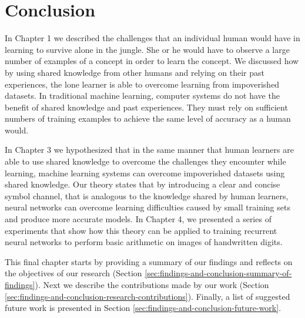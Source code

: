 \chapter{Conclusion} \label{sec:findings-and-conclusion}

In Chapter 1 we described the challenges that an individual human would have in learning to survive alone in the jungle. She or he would have to observe a large number of examples of a concept in order to learn the concept. We discussed how by using shared knowledge from other humans and relying on their past experiences, the lone learner is able to overcome learning from impoverished datasets. In traditional machine learning, computer systems do not have the benefit of shared knowledge and past experiences. They must rely on sufficient numbers of training examples to achieve the same level of accuracy as a human would.

In Chapter 3 we hypothesized that in the same manner that human learners are able to use shared knowledge to overcome the challenges they encounter while learning, machine learning systems can overcome impoverished datasets using shared knowledge. Our theory states that by introducing a clear and concise symbol channel, that is analogous to the knowledge shared by human learners, neural networks can overcome learning difficulties caused by small training sets and produce more accurate models. In Chapter 4, we presented a series of experiments that show how this theory can be applied to training recurrent neural networks to perform basic arithmetic on images of handwritten digits.

This final chapter starts by providing a summary of our findings and reflects on the objectives of our research (Section \ref{sec:findings-and-conclusion-summary-of-findings}). Next we describe the contributions made by our work (Section \ref{sec:findings-and-conclusion-research-contributions}). Finally, a list of suggested future work is presented in Section \ref{sec:findings-and-conclusion-future-work}.





